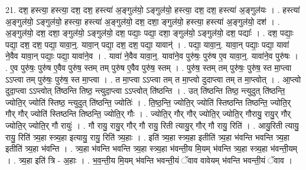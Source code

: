 \documentclass[17pt]{extarticle}
\begin{document}
21. दश॒ हस्त्या॒ हस्त्या॒ दश॒ दश॒ हस्त्या॑ अ॒ङ्गुल॑यो॒ ऽङ्गुल॑यो॒ हस्त्या॒ दश॒ दश॒ हस्त्या॑ अ॒ङ्गुल॑यः । . हस्त्या॑ अ॒ङ्गुल॑यो॒ ऽङ्गुल॑यो॒ हस्त्या॒ हस्त्या॑ अ॒ङ्गुल॑यो॒ दश॒ दशा॒ ङ्गुल॑यो॒ हस्त्या॒ हस्त्या॑ अ॒ङ्गुल॑यो॒ दश॑ । . अ॒ङ्गुल॑यो॒ दश॒ दशा॒ ङ्गुल॑यो॒ ऽङ्गुल॑यो॒ दश॒ पद्याः॒ पद्या॒ दशा॒ ङ्गुल॑यो॒ ऽङ्गुल॑यो॒ दश॒ पद्याः᳚ । . दश॒ पद्याः॒ पद्या॒ दश॒ दश॒ पद्या॒ यावा॒न्॒. यावा॒न् पद्या॒ दश॒ दश॒ पद्या॒ यावान्॑ । . पद्या॒ यावा॒न्॒. यावा॒न् पद्याः॒ पद्या॒ यावा॑ ने॒वैव यावा॒न् पद्याः॒ पद्या॒ यावा॑ने॒व । . यावा॑ ने॒वैव यावा॒न्॒. यावा॑ने॒व पुरु॑षः॒ पुरु॑ष ए॒व यावा॒न्॒. यावा॑ने॒व पुरु॑षः । . ए॒व पुरु॑षः॒ पुरु॑ष ए॒वैव पुरु॑ष॒ स्तम् तम् पुरु॑ष ए॒वैव पुरु॑ष॒ स्तम् । . पुरु॑ष॒ स्तम् तम् पुरु॑षः॒ पुरु॑ष॒ स्त मा॒प्त्वा ऽऽप्त्वा तम् पुरु॑षः॒ पुरु॑ष॒ स्त मा॒प्त्वा । . त मा॒प्त्वा ऽऽप्त्वा तम् त मा॒प्त्वो दुदाप्त्वा तम् त मा॒प्त्वोत् । . आ॒प्त्वो दुदा॒प्त्वा ऽऽप्त्वोत् ति॑ष्ठन्ति तिष्ठ॒ न्त्युदा॒प्त्वा ऽऽप्त्वोत् ति॑ष्ठन्ति । . उत् ति॑ष्ठन्ति तिष्ठ॒ न्त्युदुत् ति॑ष्ठन्ति॒ ज्योति॒र् ज्योति॑ स्तिष्ठ॒ न्त्युदुत् ति॑ष्ठन्ति॒ ज्योतिः॑ । . ति॒ष्ठ॒न्ति॒ ज्योति॒र् ज्योति॑ स्तिष्ठन्ति तिष्ठन्ति॒ ज्योति॒र् गौर् गौर् ज्योति॑ स्तिष्ठन्ति तिष्ठन्ति॒ ज्योति॒र् गौः । . ज्योति॒र् गौर् गौर् ज्योति॒र् ज्योति॒र् गौरायु॒ रायु॒र् गौर् ज्योति॒र् ज्योति॒र् गौ रायुः॑ । . गौ रायु॒ रायु॒र् गौर् गौ रायु॒ रिती त्यायु॒र् गौर् गौ रायु॒ रिति॑ । . आयु॒रिती त्यायु॒ रायु॒ रिति॑ त्र्य॒हा स्त्र्य॒हा इत्यायु॒ रायु॒ रिति॑ त्र्य॒हाः । . इति॑ त्र्य॒हा स्त्र्य॒हा इतीति॑ त्र्य॒हा भ॑वन्ति भवन्ति त्र्य॒हा इतीति॑ त्र्य॒हा भ॑वन्ति । . त्र्य॒हा भ॑वन्ति भवन्ति त्र्य॒हा स्त्र्य॒हा भ॑वन्ती॒य मि॒यम् भ॑वन्ति त्र्य॒हा स्त्र्य॒हा भ॑वन्ती॒यम् । . त्र्य॒हा इति॑ त्रि - अ॒हाः । . भ॒व॒न्ती॒य मि॒यम् भ॑वन्ति भवन्ती॒यं ॅवाव वावेयम् भ॑वन्ति भवन्ती॒यं ॅवाव । \newline
\end{document}
